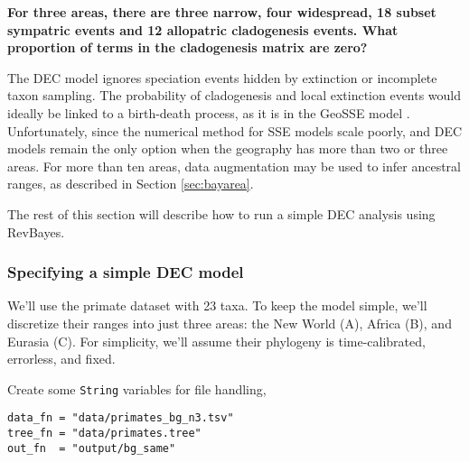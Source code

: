 {\bf {} For three areas, there are three narrow, four widespread, 18 subset sympatric events and 12 allopatric cladogenesis events. What proportion of terms in the cladogenesis matrix are zero?}

The DEC model ignores speciation events hidden by extinction or incomplete taxon sampling.
The probability of cladogenesis and local extinction events would ideally be linked to a birth-death process, as it is in the GeoSSE model \citep{goldberg11}.
Unfortunately, since the numerical method for SSE models scale poorly, and DEC models remain the only option when the geography has more than two or three areas.
For more than ten areas, data augmentation may be used to infer ancestral ranges, as described in Section \ref{sec:bayarea}.


The rest of this section will describe how to run a simple DEC analysis using RevBayes.

\newpage


\subsubsection{Specifying a simple DEC model}

We'll use the primate dataset with 23 taxa. To keep the model simple, we'll discretize their ranges into just three areas: the New World (A), Africa (B), and Eurasia (C).
For simplicity, we'll assume their phylogeny is time-calibrated, errorless, and fixed.

Create some {\tt String} variables for file handling,
{\tt \small \begin{snugshade}
\begin{lstlisting}
data_fn = "data/primates_bg_n3.tsv"
tree_fn = "data/primates.tree"
out_fn  = "output/bg_same"
\end{lstlisting}
\end{snugshade} }

